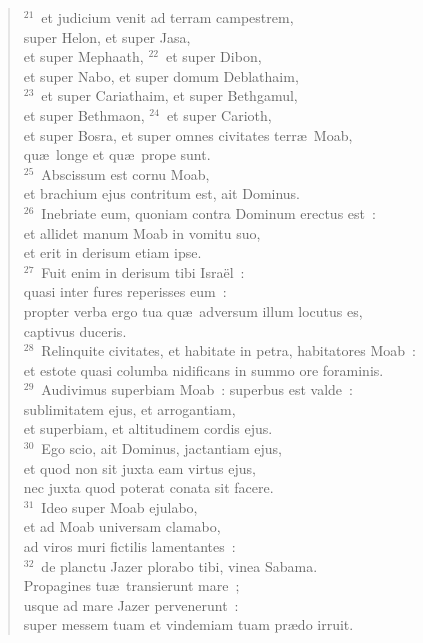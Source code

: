 \begin{flushleft}
\begin{verse}
${}^{21}$~et judicium venit ad terram campestrem,\\ super Helon, et super Jasa,\\ et super Mephaath,
${}^{22}$~et super Dibon,\\ et super Nabo, et super domum Deblathaim,\\
${}^{23}$~et super Cariathaim, et super Bethgamul,\\ et super Bethmaon,
${}^{24}$~et super Carioth,\\ et super Bosra, et super omnes civitates terr\ae\ Moab,\\ qu\ae\ longe et qu\ae\ prope sunt.\\
${}^{25}$~Abscissum est cornu Moab,\\ et brachium ejus contritum est, ait Dominus.\\
${}^{26}$~Inebriate eum, quoniam contra Dominum erectus est~:\\ et allidet manum Moab in vomitu suo,\\ et erit in derisum etiam ipse.\\
${}^{27}$~Fuit enim in derisum tibi Isra\"el~:\\ quasi inter fures reperisses eum~:\\ propter verba ergo tua qu\ae\ adversum illum locutus es,\\ captivus duceris.\\
${}^{28}$~Relinquite civitates, et habitate in petra, habitatores Moab~:\\ et estote quasi columba nidificans in summo ore foraminis.\\
${}^{29}$~Audivimus superbiam Moab~: superbus est valde~:\\ sublimitatem ejus, et arrogantiam,\\ et superbiam, et altitudinem cordis ejus.\\
${}^{30}$~Ego scio, ait Dominus, jactantiam ejus,\\ et quod non sit juxta eam virtus ejus,\\ nec juxta quod poterat conata sit facere.\\
${}^{31}$~Ideo super Moab ejulabo,\\ et ad Moab universam clamabo,\\ ad viros muri fictilis lamentantes~:\\
${}^{32}$~de planctu Jazer plorabo tibi, vinea Sabama.\\ Propagines tu\ae\ transierunt mare~;\\ usque ad mare Jazer pervenerunt~:\\ super messem tuam et vindemiam tuam pr\ae do irruit.\\

\end{verse}
\end{flushleft}
